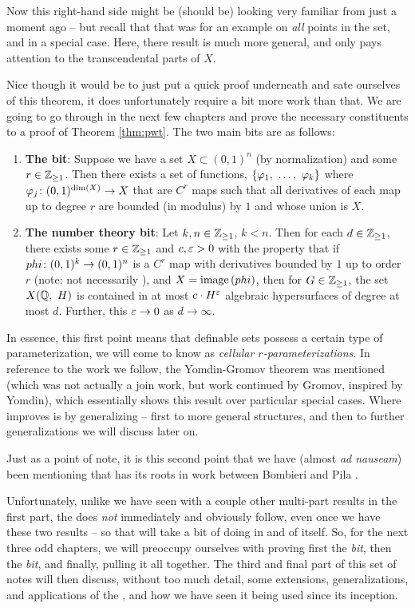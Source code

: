   Now this right-hand side might be (should be) looking very familiar from just a moment ago -- but recall that that was for an example on \emph{all} points in the set, and in a special case. Here, there result is much more general, and only pays attention to the transcendental parts of $X$.

  Nice though it would be to just put a quick proof underneath and sate ourselves of this theorem, it does unfortunately require a bit more work than that. We are going to go through in the next few chapters and prove the necessary constituents to a proof of Theorem \ref{thm:pwt}. The two main bits are as follows:
  \begin{enumerate}
    \item \textbf{The \om bit}: Suppose we have a  set $X \subset (0, 1)^n$ (by normalization) and some $r \in \Zgeq{1}$. Then there exists a set of functions, $\{ \vonevm{\phi}{k} \}$ where $\funcdom{\phi_j}{(0, 1)^{\dim{X}}}{X}$ that are $C^r$  maps such that all derivatives of each map up to degree $r$ are bounded (in modulus) by $1$ and whose union is $X$.

    \item \textbf{The number theory bit}: Let $k, n \in \Zgeq{1}$, $k < n$. Then for each $d \in \Zgeq{1}$, there exists some $r \in \Zgeq{1}$ and $c, \eps > 0$ with the property that if $\funcdom{phi}{(0, 1)^k}{(0, 1)^n}$ is a $C^r$ map with derivatives bounded by $1$ up to order $r$ (note: not necessarily ), and $X = \image{phi}$, then for $G \in \Zgeq{1}$, the set $\XQH[H]$ is contained in at most $c \cdot H^{\eps}$ algebraic hypersurfaces of degree at most $d$. Further, this $\eps \to 0$ as $d \to \infty$.

  \end{enumerate}

In essence, this first point means that definable sets possess a certain type of parameterization, we will come to know as \emph{cellular $r$-parameterizations}. In reference to the work we follow, the Yomdin-Gromov theorem was mentioned (which was not actually a join work, but work continued by Gromov, inspired by Yomdin), which essentially shows this result over particular special cases. Where \pw improves is by generalizing -- first to more general \om structures, and then to further generalizations we will discuss later on.

Just as a point of note, it is this second point that we have (almost \textit{ad nauseam}) been mentioning that has its roots in work between Bombieri and Pila \cite{bombieri_number_1989}.

Unfortunately, unlike we have seen with a couple other multi-part results in the first part, the \pwt does \emph{not} immediately and obviously follow, even once we have these two results -- so that will take a bit of doing in and of itself. So, for the next three odd chapters, we will preoccupy ourselves with proving first the \emph{\om bit}, then the \emph{\nt bit}, and finally, pulling it all together. The third and final part of this set of notes will then discuss, without too much detail, some extensions, generalizations, and applications of the \pwt, and how we have seen it being used since its inception.
